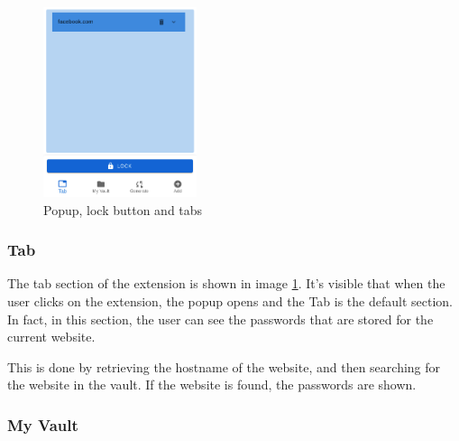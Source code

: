 \begin{figure}[h!]
    \centering
    \vspace{0.5cm}
    \includegraphics[width=0.4\textwidth]{images/extension/popup-lock-tab.png}
    \caption{Popup, lock button and tabs}
    \label{fig:popup-lock-tab} %
\end{figure}

\subsubsection {Tab}

The tab section of the extension is shown in image \ref{fig:popup-lock-tab}. It's visible that when the user clicks on the extension, the popup opens and the Tab is the default section. In fact, in this section, the user can see the passwords that are stored for the current website.

This is done by retrieving the hostname of the website, and then searching for the website in the vault. If the website is found, the passwords are shown.

\subsubsection {My Vault}

